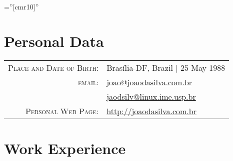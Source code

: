\documentclass[a4paper,10pt]{article} %
\begin{document}
\pagestyle{empty} %

\font\fb=''[cmr10]'' %


\par{\bigskip\par} %

\section{Personal Data}

\begin{tabular}{rl}
\textsc{Place and Date of Birth:} & Brasília-DF, Brazil | 25 May 1988 \\
\textsc{email:} & \href{mailto:joao@joaodasilva.com.br}{joao@joaodasilva.com.br}\\
& \href{mailto:jaodsilv@linux.ime.usp.br}{jaodsilv@linux.ime.usp.br}\\

\textsc{Personal Web Page:} & \href{http://joaodasilva.com.br}{http://joaodasilva.com.br}\\
\end{tabular}



\section{Work Experience}
\end{document}
